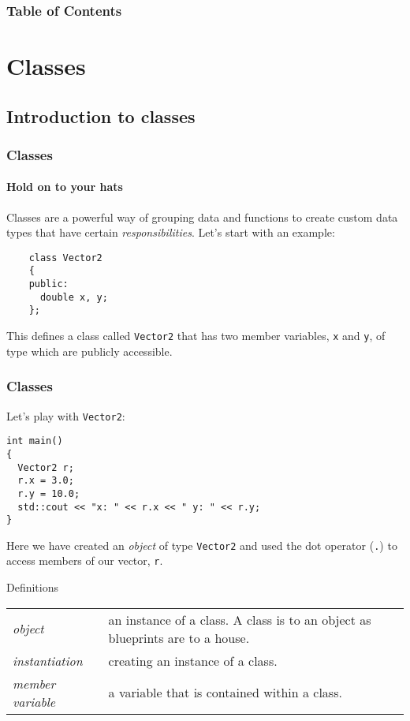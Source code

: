 \documentclass{beamer}
\subtitle{Session 3: Object oriented programming}
\begin{document}
\frame{\titlepage}

\begin{frame}
\frametitle{Table of Contents}
\tableofcontents
\end{frame}


\section{Classes}

\subsection{Introduction to classes}

\begin{frame}[fragile]
	\frametitle{Classes}
	\framesubtitle{Hold on to your hats}
	
	Classes are a powerful way of grouping data and functions to create custom data types that have certain \textit{responsibilities}.\newline
	\pause
	Let's start with an example:
	\begin{lstlisting}
	class Vector2
	{
	public:
	  double x, y;
	};
	\end{lstlisting}
	This defines a class called \texttt{Vector2} that has two member variables, \texttt{x} and \texttt{y}, of type  which are publicly accessible.
	
\end{frame}

\begin{frame}[fragile]
  \frametitle{Classes}
  
  Let's play with \texttt{Vector2}:
  \begin{lstlisting}
int main()
{
  Vector2 r;
  r.x = 3.0;
  r.y = 10.0;
  std::cout << "x: " << r.x << " y: " << r.y;
}
  \end{lstlisting}
  Here we have created an \textit{object} of type \texttt{Vector2} and used the dot operator (\texttt{.}) to access members of our vector, \texttt{r}.
  \pause
  \begin{defiblockbaree}{Definitions}
    \begin{tabularx}{\linewidth}{lX}
	    \textit{object} & an instance of a class.  A class is to an object as blueprints are to a house. \\
	    \textit{instantiation} & creating an instance of a class. \\
	    \textit{member variable} & a variable that is contained within a class.
    \end{tabularx}
  \end{defiblockbaree}

\end{frame}
\end{document}

